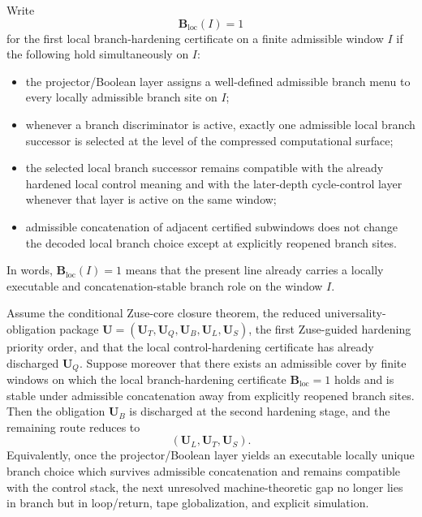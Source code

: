 \begin{definition}
Write
\[
\mathbf B_{\mathrm{loc}}(I)=1
\]
for the first local branch-hardening certificate on a finite admissible window $I$ if the following hold simultaneously on $I$:
\begin{itemize}[leftmargin=2em]
  \item the projector/Boolean layer assigns a well-defined admissible branch menu to every locally admissible branch site on $I$;
  \item whenever a branch discriminator is active, exactly one admissible local branch successor is selected at the level of the compressed computational surface;
  \item the selected local branch successor remains compatible with the already hardened local control meaning and with the later-depth cycle-control layer whenever that layer is active on the same window;
  \item admissible concatenation of adjacent certified subwindows does not change the decoded local branch choice except at explicitly reopened branch sites.
\end{itemize}
In words, $\mathbf B_{\mathrm{loc}}(I)=1$ means that the present line already carries a locally executable and concatenation-stable branch role on the window $I$.
\end{definition}

\begin{proposition}
Assume the conditional Zuse-core closure theorem, the reduced universality-obligation package \(\mathbf U=(\mathbf U_T,\mathbf U_Q,\mathbf U_B,\mathbf U_L,\mathbf U_S)\), the first Zuse-guided hardening priority order, and that the local control-hardening certificate has already discharged \(\mathbf U_Q\). Suppose moreover that there exists an admissible cover by finite windows on which the local branch-hardening certificate \(\mathbf B_{\mathrm{loc}}=1\) holds and is stable under admissible concatenation away from explicitly reopened branch sites. Then the obligation \(\mathbf U_B\) is discharged at the second hardening stage, and the remaining route reduces to
\[
(\mathbf U_L,\mathbf U_T,\mathbf U_S).
\]
Equivalently, once the projector/Boolean layer yields an executable locally unique branch choice which survives admissible concatenation and remains compatible with the control stack, the next unresolved machine-theoretic gap no longer lies in branch but in loop/return, tape globalization, and explicit simulation.
\end{proposition}

